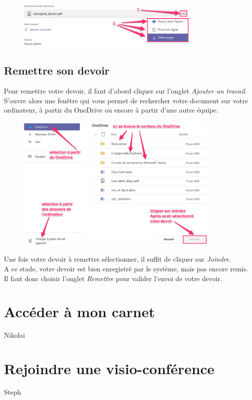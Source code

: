 \begin{figure}[h]
\includegraphics[width=9cm]{./images/teams/choix_pointilles}
\centering
\end{figure}

\subsection{Remettre son devoir}

Pour remettre votre devoir, il faut d'abord cliquer sur l'onglet \textit{Ajouter un travail}. S'ouvre alors une fenêtre qui vous permet de rechercher votre document sur votre ordinateur, à partir du OneDrive ou encore à partir d'une autre équipe.

\begin{figure}[H]
\includegraphics[width=10cm]{./images/teams/selection_devoir}
\centering
\end{figure}

Une fois votre devoir à remettre sélectionner, il suffit de cliquer sur \textit{Joindre}.\\

A ce stade, votre devoir est bien enregistré par le système, mais pas encore remis. Il faut donc choisir l'onglet \textit{Remettre} pour valider l'envoi de votre devoir.


\section{Accéder à mon carnet}

Nikolai

\section{Rejoindre une visio-conférence}

Steph


